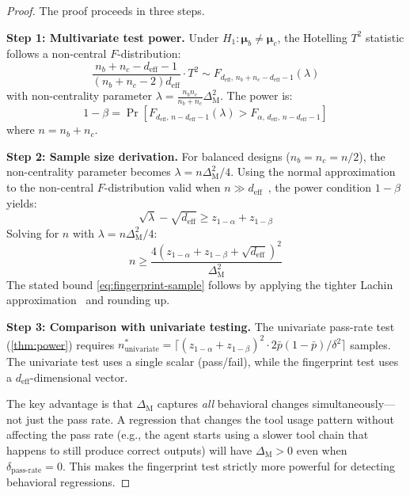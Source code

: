 \begin{proof}
The proof proceeds in three steps.

\textbf{Step 1: Multivariate test power.}
Under $H_1: \boldsymbol{\mu}_b \neq \boldsymbol{\mu}_c$, the
Hotelling $T^2$ statistic follows a non-central $F$-distribution:
\begin{equation}
  \frac{n_b + n_c - d_{\mathrm{eff}} - 1}
       {(n_b + n_c - 2) d_{\mathrm{eff}}} \cdot T^2
  \sim F_{d_{\mathrm{eff}},\, n_b + n_c - d_{\mathrm{eff}} - 1}
       (\lambda)
\end{equation}
with non-centrality parameter $\lambda = \frac{n_b n_c}{n_b + n_c}
\Delta_{\mathrm{M}}^2$. The power is:
\begin{equation}
  1 - \beta = \Pr\!\left[
    F_{d_{\mathrm{eff}},\, n-d_{\mathrm{eff}}-1}(\lambda)
    > F_{\alpha,\, d_{\mathrm{eff}},\, n-d_{\mathrm{eff}}-1}
  \right]
\end{equation}
where $n = n_b + n_c$.

\textbf{Step 2: Sample size derivation.}
For balanced designs ($n_b = n_c = n/2$), the non-centrality parameter
becomes $\lambda = n \Delta_{\mathrm{M}}^2 / 4$. Using the normal
approximation to the non-central $F$-distribution valid when
$n \gg d_{\mathrm{eff}}$~\citep{muirhead2005aspects}, the power
condition $1 - \beta$ yields:
\begin{equation}
  \sqrt{\lambda} - \sqrt{d_{\mathrm{eff}}}
  \geq z_{1-\alpha} + z_{1-\beta}
\end{equation}
Solving for $n$ with $\lambda = n\Delta_{\mathrm{M}}^2/4$:
\begin{equation}
  n \geq \frac{4(z_{1-\alpha} + z_{1-\beta} +
    \sqrt{d_{\mathrm{eff}}})^2}{\Delta_{\mathrm{M}}^2}
\end{equation}
The stated bound \eqref{eq:fingerprint-sample} follows by applying the
tighter Lachin approximation~\citep{lachin1981introduction} and
rounding up.

\textbf{Step 3: Comparison with univariate testing.}
The univariate pass-rate test (\cref{thm:power}) requires
$n^*_{\mathrm{univariate}} = \lceil (z_{1-\alpha} +
z_{1-\beta})^2 \cdot 2\bar{p}(1-\bar{p}) / \delta^2 \rceil$
samples. The univariate test uses a single scalar (pass/fail), while
the fingerprint test uses a $d_{\mathrm{eff}}$-dimensional vector.

The key advantage is that $\Delta_{\mathrm{M}}$ captures
\emph{all} behavioral changes simultaneously---not just the pass
rate. A regression that changes the tool usage pattern without
affecting the pass rate (e.g., the agent starts using a slower tool
chain that happens to still produce correct outputs) will have
$\Delta_{\mathrm{M}} > 0$ even when $\delta_{\text{pass-rate}} = 0$.
This makes the fingerprint test strictly more powerful for detecting
behavioral regressions.


\end{proof}
